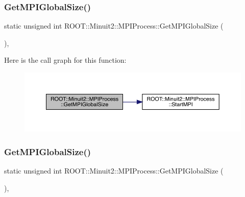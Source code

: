 \subsubsection{\texorpdfstring{GetMPIGlobalSize()}{GetMPIGlobalSize()}\hspace{0.1cm}{\footnotesize\ttfamily [1/2]}}
{\footnotesize\ttfamily static unsigned int R\+O\+O\+T\+::\+Minuit2\+::\+M\+P\+I\+Process\+::\+Get\+M\+P\+I\+Global\+Size (\begin{DoxyParamCaption}{ }\end{DoxyParamCaption})\hspace{0.3cm}{\ttfamily [inline]}, {\ttfamily [static]}}

Here is the call graph for this function\+:
\nopagebreak
\begin{figure}[H]
\begin{center}
\leavevmode
\includegraphics[width=350pt]{dc/d43/classROOT_1_1Minuit2_1_1MPIProcess_acfa3106122ad8f8c7d6bb3777c3d1ccc_cgraph}
\end{center}
\end{figure}
\mbox{\label{classROOT_1_1Minuit2_1_1MPIProcess_acfa3106122ad8f8c7d6bb3777c3d1ccc}} 
\subsubsection{\texorpdfstring{GetMPIGlobalSize()}{GetMPIGlobalSize()}\hspace{0.1cm}{\footnotesize\ttfamily [2/2]}}
{\footnotesize\ttfamily static unsigned int R\+O\+O\+T\+::\+Minuit2\+::\+M\+P\+I\+Process\+::\+Get\+M\+P\+I\+Global\+Size (\begin{DoxyParamCaption}{ }\end{DoxyParamCaption})\hspace{0.3cm}{\ttfamily [inline]}, {\ttfamily [static]}}

